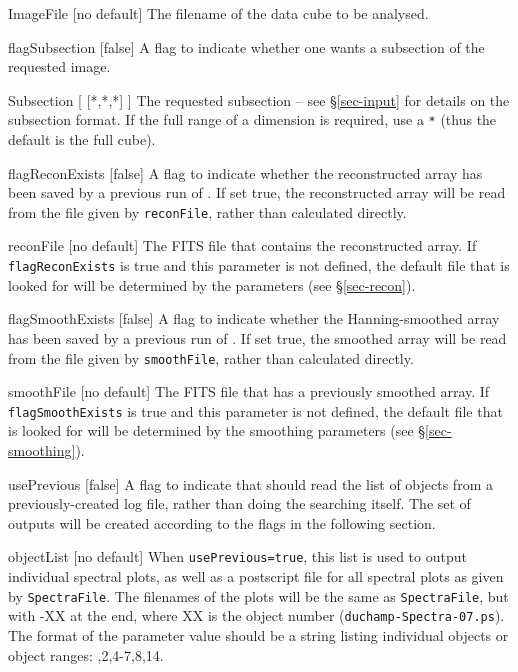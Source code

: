 \begin{Lentry}
\item[{ImageFile [no default]}] The filename of the
  data cube to be analysed. 
\item[{flagSubsection [false]}] A flag to indicate whether one
  wants a subsection of the requested image.
\item[{Subsection [ [*,*,*] ]}] The requested subsection
 -- see \S\ref{sec-input} for details on the subsection format.  If
 the full range of a dimension is required, use a \texttt{*} (thus the
 default is the full cube).
\item[{flagReconExists [false]}] A flag to indicate whether the
  reconstructed array has been saved by a previous run of \duchamp. If
  set true, the reconstructed array will be read from the file given
  by \texttt{reconFile}, rather than calculated directly.
\item[{reconFile [no default]}] The FITS file that contains the
  reconstructed array. If \texttt{flagReconExists} is true and this
  parameter is not defined, the default file that is looked for will
  be determined by the \atrous parameters (see \S\ref{sec-recon}).
\item[{flagSmoothExists [false]}] A flag to indicate whether the
  Hanning-smoothed array has been saved by a previous run of \duchamp. If
  set true, the smoothed array will be read from the file given
  by \texttt{smoothFile}, rather than calculated directly.
\item[{smoothFile [no default]}] The FITS file that has
  a previously smoothed array. If \texttt{flagSmoothExists}
  is true and this parameter is not defined, the default file that is
  looked for will be determined by the smoothing parameters (see
  \S\ref{sec-smoothing}).
\item[{usePrevious [false]}] A flag to indicate that \duchamp should
  read the list of objects from a previously-created log file, rather
  than doing the searching itself. The set of outputs will be created
  according to the flags in the following section.
\item[{objectList [no default]}] When \texttt{usePrevious=true}, this
  list is used to output individual spectral plots, as well as a
  postscript file for all spectral plots as given by
  \texttt{SpectraFile}. The filenames of the plots will be the same as
  \texttt{SpectraFile}, but with -XX at the end, where XX is the
  object number (\eg \texttt{duchamp-Spectra-07.ps}). The format of
  the parameter value should be a string listing individual objects or
  object ranges: ,2,4-7,8,14.
\end{Lentry}

